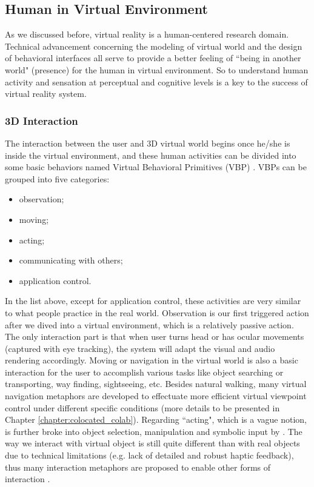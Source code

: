 \subsection{Human in Virtual Environment}
As we discussed before, virtual reality is a human-centered research domain. Technical advancement concerning the modeling of virtual world and the design of behavioral interfaces all serve to provide a better feeling of ``being in another world" (presence) for the human in virtual environment. So to understand human activity and sensation at perceptual and cognitive levels is a key to the success of virtual reality system.

\subsubsection{3D Interaction}
\label{sec:3D_inter}
The interaction between the user and 3D virtual world begins once he/she is inside the virtual environment, and these human activities can be divided into some basic behaviors named Virtual Behavioral Primitives (VBP) \citet{Fuchs2011Book}. VBPs can be grouped into five categories:

\begin{itemize}
  \item observation;
  \item moving;
  \item acting;
  \item communicating with others;
  \item application control.
\end{itemize}

In the list above, except for application control, these activities are very similar to what people practice in the real world. Observation is our first triggered action after we dived into a virtual environment, which is a relatively passive action. The only interaction part is that when user turns head or has ocular movements (captured with eye tracking), the system will adapt the visual and audio rendering accordingly. Moving or navigation in the virtual world is also a basic interaction for the user to accomplish various tasks like object searching or transporting, way finding, sightseeing, etc. Besides natural walking, many virtual navigation metaphors are developed to effectuate more efficient virtual viewpoint control under different specific conditions (more details to be presented in Chapter \ref{chapter:colocated_colab}). Regarding ``acting", which is a vague notion, is further broke into object selection, manipulation and symbolic input by \citet{Bowman2004UIT}. The way we interact with virtual object is still quite different than with real objects due to technical limitations (e.g. lack of detailed and robust haptic feedback), thus many interaction metaphors are proposed to enable other forms of interaction \citep{Hand1997Survey}.


